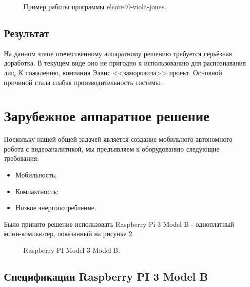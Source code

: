 \documentclass[14pt,a4paper]{scrartcl}
\begin{document}
		\begin{figure}[h]
			\caption{Пример работы программы elcore40-viola-jones.}
			\label{fig:Viola-Jones_Putty}
		\end{figure}
	
	\subsection{Результат}
	
		На данном этапе отечественному аппаратному решению требуется серьёзная доработка. В текущем виде оно не пригодно к использованию для распознавания лиц. К сожалению, компания Элвис <<заморозила>> проект. Основной причиной стала слабая производительность системы.

\section{Зарубежное аппаратное решение}

	Поскольку нашей общей задачей является создание мобильного автономного робота с видеоаналитикой, мы предъявляем к оборудованию следующие требования:
	\begin{itemize}
		\item Мобильность;
		\item Компактность;
		\item Низкое энергопотребление.
	\end{itemize}
	
	Было принято решение использовать Raspberry Pi 3 Model B - одноплатный мини-компьютер, показанный на рисунке \ref{fig:PI1}.
	
	\begin{figure}[h]
		\caption{Raspberry PI Model 3 Model B.}
		\label{fig:PI1}
	\end{figure}

	\subsection{Спецификации Raspberry PI 3 Model B}
	
\end{document}
